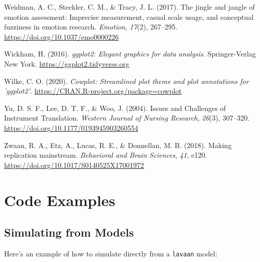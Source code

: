 \documentclass[
  man,floatsintext]{apa7}
\newlength{\cslhangindent}
\newenvironment{CSLReferences}[2] %
 {\begin{list}{}{%
  \setlength{\itemindent}{0pt}
  \setlength{\leftmargin}{0pt}
  \setlength{\parsep}{0pt}
  \ifodd #1
   \setlength{\leftmargin}{\cslhangindent}
   \setlength{\itemindent}{-1\cslhangindent}
  \fi
  \setlength{\itemsep}{#2\baselineskip}}}
 {\end{list}}
\begin{document}
\begin{CSLReferences}{1}{0}
Weidman, A. C., Steckler, C. M., \& Tracy, J. L. (2017). The jingle and jangle of emotion assessment: Imprecise measurement, casual scale usage, and conceptual fuzziness in emotion research. \emph{Emotion}, \emph{17}(2), 267--295. \url{https://doi.org/10.1037/emo0000226}

Wickham, H. (2016). \emph{ggplot2: Elegant graphics for data analysis}. Springer-Verlag New York. \url{https://ggplot2.tidyverse.org}

Wilke, C. O. (2020). \emph{Cowplot: Streamlined plot theme and plot annotations for 'ggplot2'}. \url{https://CRAN.R-project.org/package=cowplot}

Yu, D. S. F., Lee, D. T. F., \& Woo, J. (2004). Issues and Challenges of Instrument Translation. \emph{Western Journal of Nursing Research}, \emph{26}(3), 307--320. \url{https://doi.org/10.1177/0193945903260554}

Zwaan, R. A., Etz, A., Lucas, R. E., \& Donnellan, M. B. (2018). Making replication mainstream. \emph{Behavioral and Brain Sciences}, \emph{41}, e120. \url{https://doi.org/10.1017/S0140525X17001972}

\end{CSLReferences}

\newpage

\appendix


\section{Code Examples}\label{code-examples}

\subsection{Simulating from Models}\label{simulating-from-models}

Here's an example of how to simulate directly from a \texttt{lavaan} model:

\small
\end{document}
